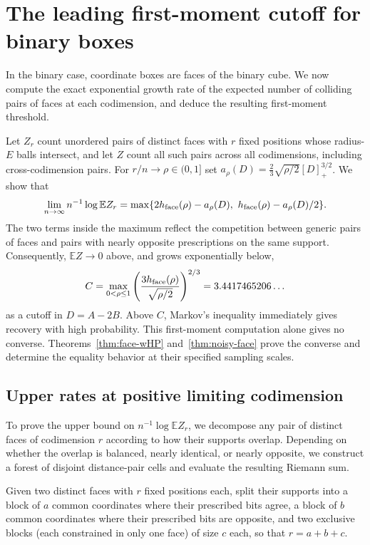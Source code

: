 \section{The leading first-moment cutoff for binary boxes}\label{sec:face-first}
In the binary case, coordinate boxes are faces of the binary cube. We now compute the exact exponential growth rate of the expected number of colliding pairs of faces at each codimension, and deduce the resulting first-moment threshold.

Let $Z_r$ count unordered pairs of distinct faces with $r$ fixed positions whose radius-$E$ balls intersect, and let $Z$ count all such pairs across all codimensions, including cross-codimension pairs. For $r/n\to\rho\in(0,1]$ set $a_\rho(D)=\tfrac23\sqrt{\rho/2}[D]_+^{3/2}$. We show that
\[
 \lim_{n\to\infty}n^{-1}\log\mathbb E Z_r
 =\max\{2h_{\rm face}(\rho)-a_\rho(D),\ h_{\rm face}(\rho)-a_\rho(D)/2\}.
\]
The two terms inside the maximum reflect the competition between generic pairs of faces and pairs with nearly opposite prescriptions on the same support. Consequently, $\mathbb E Z\to0$ above, and grows exponentially below,
\[
 C=\max_{0<\rho\le1}\left(\frac{3h_{\rm face}(\rho)}{\sqrt{\rho/2}}\right)^{2/3}
 =3.4417465206\ldots
\]
as a cutoff in $D=A-2B$. Above $C$, Markov's inequality immediately gives recovery with high probability. This first-moment computation alone gives no converse. Theorems~\ref{thm:face-wHP} and~\ref{thm:noisy-face} prove the converse and determine the equality behavior at their specified sampling scales.

\subsection{Upper rates at positive limiting codimension}\label{sec:face-modal}
To prove the upper bound on $n^{-1}\log\mathbb E Z_r$, we decompose any pair of distinct faces of codimension $r$ according to how their supports overlap. Depending on whether the overlap is balanced, nearly identical, or nearly opposite, we construct a forest of disjoint distance-pair cells and evaluate the resulting Riemann sum.

Given two distinct faces with $r$ fixed positions each, split their supports into a block of $a$ common coordinates where their prescribed bits agree, a block of $b$ common coordinates where their prescribed bits are opposite, and two exclusive blocks (each constrained in only one face) of size $c$ each, so that $r=a+b+c$.

